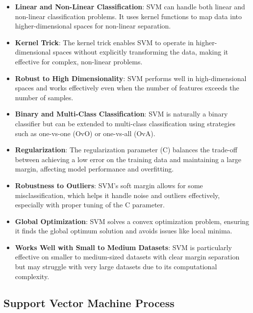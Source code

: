 \begin{itemize}
    \item \textbf{Linear and Non-Linear Classification}: SVM can handle both linear and non-linear classification problems.
    It uses kernel functions to map data into higher-dimensional spaces for non-linear separation.

    \item \textbf{Kernel Trick}: The kernel trick enables SVM to operate in higher-dimensional spaces without explicitly transforming the data, making it effective for complex, non-linear problems.

    \item \textbf{Robust to High Dimensionality}: SVM performs well in high-dimensional spaces and works effectively even when the number of features exceeds the number of samples.

    \item \textbf{Binary and Multi-Class Classification}: SVM is naturally a binary classifier but can be extended to multi-class classification using strategies such as one-vs-one (OvO) or one-vs-all (OvA).

    \item \textbf{Regularization}: The regularization parameter (C) balances the trade-off between achieving a low error on the training data and maintaining a large margin, affecting model performance and overfitting.

    \item \textbf{Robustness to Outliers}: SVM’s soft margin allows for some misclassification, which helps it handle noise and outliers effectively, especially with proper tuning of the C parameter.

    \item \textbf{Global Optimization}: SVM solves a convex optimization problem, ensuring it finds the global optimum solution and avoids issues like local minima.

    \item \textbf{Works Well with Small to Medium Datasets}: SVM is particularly effective on smaller to medium-sized datasets with clear margin separation but may struggle with very large datasets due to its computational complexity.
\end{itemize}

\subsection{Support Vector Machine Process}
\label{subsec:support-vector-machine-process}

